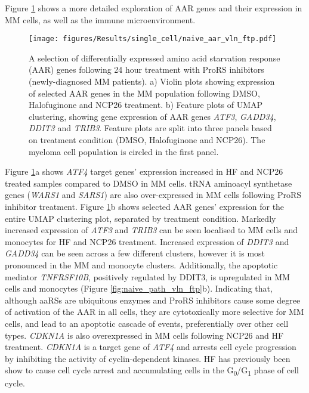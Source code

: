 Figure \ref{fig:naive_aar_vln_ftp} shows a more detailed exploration of AAR genes and their expression in MM cells, as well as the immune microenvironment.
%
\begin{figure}[htb]
\centering
\texttt{[image: figures/Results/single\_cell/naive\_aar\_vln\_ftp.pdf]}
\caption[scRNA-seq differentially expressed AAR genes- newly diagnosed patients]{A selection of differentially expressed amino acid starvation response (AAR) genes following 24 hour treatment with ProRS inhibitors (newly-diagnosed MM patients).
    a) Violin plots showing expression of selected AAR genes in the MM population following DMSO, Halofuginone and NCP26 treatment.
    b) Feature plots of UMAP clustering, showing gene expression of AAR genes \textit{ATF3}, \textit{GADD34}, \textit{DDIT3} and \textit{TRIB3}.
Feature plots are split into three panels based on treatment condition (DMSO, Halofuginone and NCP26).
The myeloma cell population is circled in the first panel.}
\label{fig:naive_aar_vln_ftp}
\end{figure}
Figure \ref{fig:naive_aar_vln_ftp}a shows \textit{ATF4} target genes' expression increased in HF and NCP26 treated samples compared to DMSO in MM cells.
tRNA aminoacyl synthetase genes (\textit{WARS1} and \textit{SARS1}) are also over-expressed in MM cells following ProRS inhibitor treatment.
Figure \ref{fig:naive_aar_vln_ftp}b shows selected AAR genes' expression for the entire UMAP clustering plot, separated by treatment condition.
Markedly increased expression of \textit{ATF3} and \textit{TRIB3} can be seen localised to MM cells and monocytes for HF and NCP26 treatment.
Increased expression of \textit{DDIT3} and \textit{GADD34} can be seen across a few different clusters, however it is most pronounced in the MM and monocyte clusters.
Additionally, the apoptotic mediator \textit{TNFRSF10B}, positively regulated by DDIT3, is upregulated in MM cells and monocytes (Figure \ref{fig:naive_path_vln_ftp}b).
Indicating that, although aaRSs are ubiquitous enzymes and ProRS inhibitors cause some degree of activation of the AAR in all cells, they are cytotoxically more selective for MM cells, and lead to an apoptotic cascade of events, preferentially over other cell types.
\textit{CDKN1A} is also overexpressed in MM cells following NCP26 and HF treatment.
\textit{CDKN1A} is a target gene of \textit{ATF4} and arrests cell cycle progression by inhibiting the activity of cyclin-dependent kinases.
HF has previously been show to cause cell cycle arrest and accumulating cells in the G\textsubscript{0}/G\textsubscript{1} phase of cell cycle.
